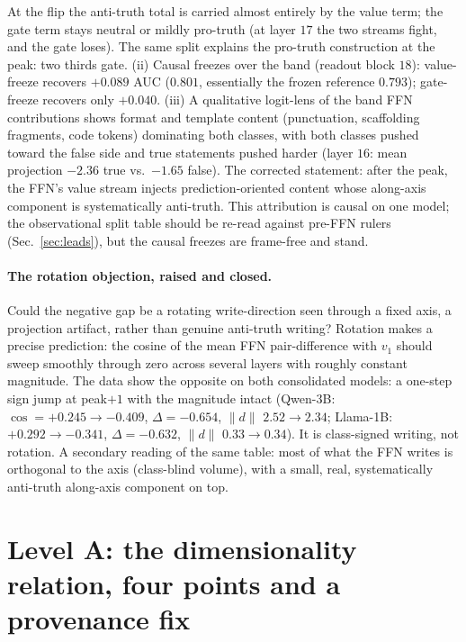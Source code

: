 \documentclass[11pt]{article}
\begin{document}
At the flip the anti-truth total is carried almost entirely by the value
term; the gate term stays neutral or mildly pro-truth (at layer $17$ the two
streams fight, and the gate loses). The same split explains the pro-truth
construction at the peak: two thirds gate. (ii) Causal freezes over the band
(readout block $18$): value-freeze recovers $+0.089$ AUC ($0.801$,
essentially the frozen reference $0.793$); gate-freeze recovers only
$+0.040$. (iii) A qualitative logit-lens of the band FFN contributions shows
format and template content (punctuation, scaffolding fragments, code
tokens) dominating both classes, with both classes pushed toward the false
side and true statements pushed harder (layer $16$: mean projection $-2.36$
true vs.\ $-1.65$ false). The corrected statement: after the peak, the FFN's
value stream injects prediction-oriented content whose along-axis component
is systematically anti-truth. This attribution is causal on one model; the
observational split table should be re-read against pre-FFN rulers
(Sec.~\ref{sec:leads}), but the causal freezes are frame-free and stand.

\paragraph{The rotation objection, raised and closed.} Could the negative
gap be a rotating write-direction seen through a fixed axis, a projection
artifact, rather than genuine anti-truth writing? Rotation makes a precise
prediction: the cosine of the mean FFN pair-difference with $v_1$ should
sweep smoothly through zero across several layers with roughly constant
magnitude. The data show the opposite on both consolidated models: a
one-step sign jump at peak$+1$ with the magnitude intact (Qwen-3B:
$\cos = +0.245 \to -0.409$, $\Delta = -0.654$, $\lVert d \rVert$
$2.52 \to 2.34$; Llama-1B: $+0.292 \to -0.341$, $\Delta = -0.632$,
$\lVert d \rVert$ $0.33 \to 0.34$). It is class-signed writing, not
rotation. A secondary reading of the same table: most of what the FFN
writes is orthogonal to the axis (class-blind volume), with a small, real,
systematically anti-truth along-axis component on top.

\section{Level A: the dimensionality relation, four points and a provenance fix}
\label{sec:dimlaw}
\end{document}
